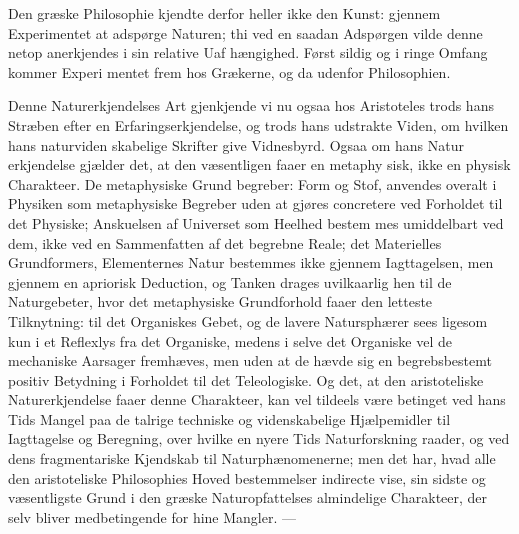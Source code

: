 \documentclass[12pt,a4paper]{book}
\begin{document}
Den græske Philosophie kjendte derfor heller ikke den Kunst:
gjennem Experimentet at adspørge Naturen; thi ved en saadan
Adspørgen vilde denne netop anerkjendes i sin relative Uaf\-%
hængighed. Først sildig og i ringe Omfang kommer Experi\-%
mentet frem hos Grækerne, og da udenfor Philosophien.

Denne Naturerkjendelses Art gjenkjende vi nu ogsaa hos
Aristoteles trods hans Stræben efter en Erfaringserkjendelse,
og trods hans udstrakte Viden, om hvilken hans naturviden\-%
skabelige Skrifter give Vidnesbyrd. Ogsaa om hans Natur\-%
erkjendelse gjælder det, at den væsentligen faaer en metaphy\-%
sisk, ikke en physisk Charakteer. De metaphysiske Grund\-%
begreber: Form og Stof, anvendes overalt i Physiken som
metaphysiske Begreber uden at gjøres concretere ved Forholdet
til det Physiske; Anskuelsen af Universet som Heelhed bestem\-%
mes umiddelbart ved dem, ikke ved en Sammenfatten af det
begrebne Reale; det Materielles Grundformers, Elementernes
Natur bestemmes ikke gjennem Iagttagelsen, men gjennem en
apriorisk Deduction, og Tanken drages uvilkaarlig hen til de
Naturgebeter, hvor det metaphysiske Grundforhold faaer den
letteste Tilknytning: til det Organiskes Gebet, og de lavere
Natursphærer sees ligesom kun i et Reflexlys fra det Organiske,
medens i selve det Organiske vel de mechaniske Aarsager
fremhæves, men uden at de hævde sig en begrebsbestemt
positiv Betydning i Forholdet til det Teleologiske. Og det, at
den aristoteliske Naturerkjendelse faaer denne Charakteer, kan
vel tildeels være betinget ved hans Tids Mangel paa de talrige
techniske og videnskabelige Hjælpemidler til Iagttagelse og
Beregning, over hvilke en nyere Tids Naturforskning raader,
og ved dens fragmentariske Kjendskab til Naturphænomenerne;
men det har, hvad alle den aristoteliske Philosophies Hoved\-%
bestemmelser indirecte vise, sin sidste og væsentligste Grund
i den græske Naturopfattelses almindelige Charakteer, der selv
bliver medbetingende for hine Mangler. ---
\end{document}

